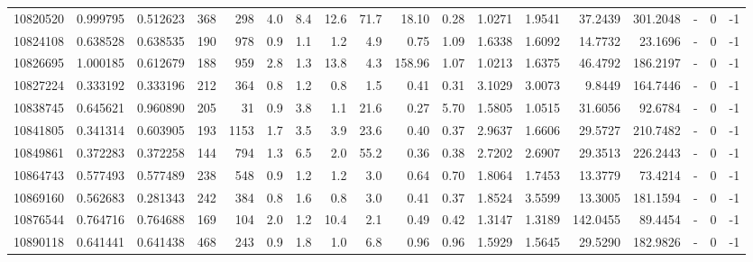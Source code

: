\begin{tabular}{rrrrrrrrrrrrrrrlrr}
  10820520 & 0.999795 &   0.512623 &  368 &  298 &      4.0 &      8.4 &    12.6 &     71.7 &      18.10 &        0.28 &  1.0271 &  1.9541 &   37.2439 &  301.2048 &             - &        0 &         -1 \\
  10824108 & 0.638528 &   0.638535 &  190 &  978 &      0.9 &      1.1 &     1.2 &      4.9 &       0.75 &        1.09 &  1.6338 &  1.6092 &   14.7732 &   23.1696 &             - &        0 &         -1 \\
  10826695 & 1.000185 &   0.612679 &  188 &  959 &      2.8 &      1.3 &    13.8 &      4.3 &     158.96 &        1.07 &  1.0213 &  1.6375 &   46.4792 &  186.2197 &             - &        0 &         -1 \\
  10827224 & 0.333192 &   0.333196 &  212 &  364 &      0.8 &      1.2 &     0.8 &      1.5 &       0.41 &        0.31 &  3.1029 &  3.0073 &    9.8449 &  164.7446 &             - &        0 &         -1 \\
  10838745 & 0.645621 &   0.960890 &  205 &   31 &      0.9 &      3.8 &     1.1 &     21.6 &       0.27 &        5.70 &  1.5805 &  1.0515 &   31.6056 &   92.6784 &             - &        0 &         -1 \\
  10841805 & 0.341314 &   0.603905 &  193 & 1153 &      1.7 &      3.5 &     3.9 &     23.6 &       0.40 &        0.37 &  2.9637 &  1.6606 &   29.5727 &  210.7482 &             - &        0 &         -1 \\
  10849861 & 0.372283 &   0.372258 &  144 &  794 &      1.3 &      6.5 &     2.0 &     55.2 &       0.36 &        0.38 &  2.7202 &  2.6907 &   29.3513 &  226.2443 &             - &        0 &         -1 \\
  10864743 & 0.577493 &   0.577489 &  238 &  548 &      0.9 &      1.2 &     1.2 &      3.0 &       0.64 &        0.70 &  1.8064 &  1.7453 &   13.3779 &   73.4214 &             - &        0 &         -1 \\
  10869160 & 0.562683 &   0.281343 &  242 &  384 &      0.8 &      1.6 &     0.8 &      3.0 &       0.41 &        0.37 &  1.8524 &  3.5599 &   13.3005 &  181.1594 &             - &        0 &         -1 \\
  10876544 & 0.764716 &   0.764688 &  169 &  104 &      2.0 &      1.2 &    10.4 &      2.1 &       0.49 &        0.42 &  1.3147 &  1.3189 &  142.0455 &   89.4454 &             - &        0 &         -1 \\
  10890118 & 0.641441 &   0.641438 &  468 &  243 &      0.9 &      1.8 &     1.0 &      6.8 &       0.96 &        0.96 &  1.5929 &  1.5645 &   29.5290 &  182.9826 &             - &        0 &         -1 \\

\end{tabular}
